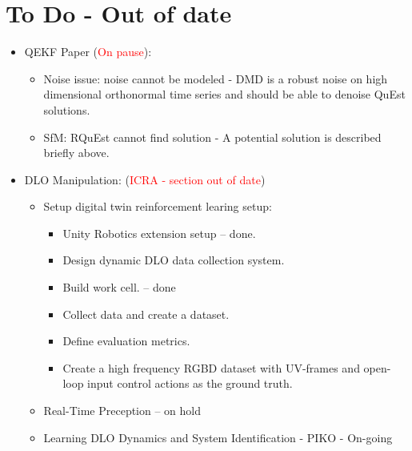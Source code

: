 \documentclass[11pt]{article}
\begin{document}
\section{To Do - Out of date}
\begin{itemize}
  \item QEKF Paper (\textcolor{red}{On pause}):
  \begin{itemize}
      \item Noise issue: noise cannot be modeled - DMD is a robust noise on high dimensional orthonormal time series and should be able to denoise QuEst solutions.
      \item SfM: RQuEst cannot find solution - A potential solution is described  briefly above.
  \end{itemize}
  \item  DLO Manipulation: (\textcolor{red}{ICRA - section out of date})
  \begin{itemize}
      \item Setup digital twin reinforcement learing setup:
      \begin{itemize}
        \item Unity Robotics extension setup -- done.
        \item Design dynamic DLO data collection system.
        \item Build work cell. -- done
        \item Collect data and create a dataset.
        \item Define evaluation metrics.
        \item Create a high frequency RGBD dataset with UV-frames and open-loop input control actions as the ground truth.
      \end{itemize}
      \item Real-Time Preception -- on hold
      \item Learning DLO Dynamics and System Identification - PIKO - On-going
  \end{itemize}
\end{itemize}

\newpage
\end{document}
